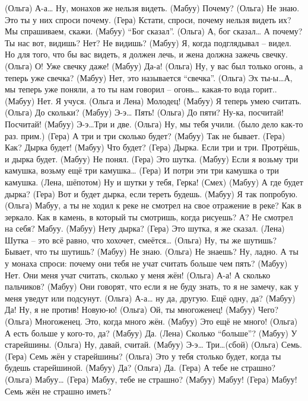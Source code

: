  (Ольга) А-а… Ну, монахов же нельзя видеть. 
 (Мабуу) Почему? 
 (Ольга) Не знаю. Это ты у них спроси почему.
 (Гера)  Кстати, спроси, почему нельзя видеть их?  Мы спрашиваем, скажи. 
 (Мабуу) ``Бог сказал''.
 (Ольга)  А, бог сказал… А почему?  Ты нас вот, видишь? Нет?  Не видишь?
 (Мабуу)  Я, когда подглядывал – видел. Но для того, что бы вас видеть, я должен лечь, и жена должна зажечь свечку.
 (Ольга)  О! Уже свечку даже!
 (Мабуу)  Да-а!
 (Ольга)  Ну, у вас был только огонь, а теперь уже свечка?
 (Мабуу)  Нет, это называется ``свечка''.
 (Ольга)  Эх ты-ы…А, мы теперь уже поняли, а то ты нам говорил – огонь… какая-то вода горит..
 (Мабуу)  Нет. Я учуся.
 (Ольга и Лена) Молодец!
  (Мабуу) Я теперь умею считать.
 (Ольга)  До скольки? 
 (Мабуу)  Э-э… Пять!
 (Ольга)  До пяти? Ну-ка, посчитай! Посчитай!
 (Мабуу) Э-э…Три и две.
 (Ольга) Ну, мы тебя учили. (было дело как-то раз. прим.)
 (Гера)  А три и три сколько будет? 
 (Мабуу) Так не бывает.
 (Гера)  Как? Дырка будет!
 (Мабуу) Что будет?
 (Гера)  Дырка. Если три и три. Протрёшь, и дырка будет. 
 (Мабуу) Не понял. 
 (Гера)  Это шутка. 
 (Мабуу) Если я возьму три камушка, возьму ещё три камушка… 
 (Гера)  И потри эти три камушка о три камушка.
 (Лена, шёпотом) Ну и шутки у тебя, Герка!
 (Смех)
 (Мабуу) А где будет дырка? 
 (Гера)  Вот и будет дырка, если тереть будешь. 
 (Мабуу) Я так попробую. 
 (Ольга) Мабуу, а ты не ходил к реке не смотрел на свое отражение в реке? Как в зеркало. Как в камень, в который ты смотришь, когда рисуешь? А? Не смотрел на себя? Мабуу.
 (Мабуу) Нету дырка?
 (Гера)  Это шутка, я же сказал.
 (Лена)  Шутка – это всё равно, что хохочет, смеётся…
 (Ольга) Ну, ты же шутишь? Бывает, что ты шутишь? 
 (Мабуу) Не знаю.
 (Ольга) Не знаешь? Ну, ладно. А ты у монаха спроси: почему они тебя не учат считать больше чем пять?
 (Мабуу) Нет. Они меня учат считать, сколько у меня жён!
 (Ольга) А-а! А сколько пальчиков?
 (Мабуу) Они говорят, что если я не буду знать, то я не замечу, как у меня уведут или подсунут. 
 (Ольга) А-а… ну да, другую. Ещё одну, да?
 (Мабуу) Да! Ну, я не против! Новую-ю!
 (Ольга) Ой, ты многоженец!
 (Мабуу) Чего? 
 (Ольга) Многоженец. Это, когда много жён.
 (Мабуу) Это ещё не много!
 (Ольга) А есть больше у кого-то, да? 
 (Мабуу) Да.
 (Лена)  Сколько ``больше''?
 (Мабуу) У старейшины. 
 (Ольга) Ну, давай, считай. 
 (Мабуу) Э-э… Три…(сбой)
 (Ольга) Семь.
 (Гера)  Семь жён у старейшины?
 (Ольга) Это у тебя столько будет, когда ты будешь старейшиной. 
 (Мабуу) Да?
 (Ольга) Да. 
 (Гера)  А тебе не страшно? 
 (Ольга) Мабуу…
 (Гера)  Мабуу, тебе не страшно?
 (Мабуу) Мабуу!
 (Гера)  Мабуу! Семь жён не страшно иметь? 
